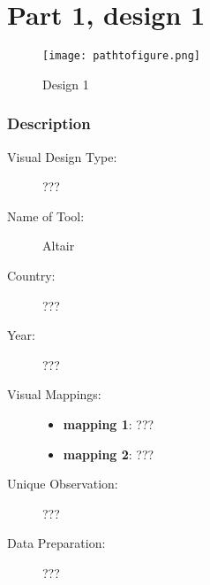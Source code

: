 \hypertarget{part-1-design-1}{%
\section{Part 1, design 1}\label{part-1-design-1}}

\begin{figure}
\centering
\texttt{[image: pathtofigure.png]}
\caption{Design 1}
\end{figure}

\hypertarget{description}{%
\subsubsection{Description}\label{description}}

\begin{description}
\item[Visual Design Type:]
???
\item[Name of Tool:]
Altair
\item[Country:]
???
\item[Year:]
???
\item[Visual Mappings:]
\begin{itemize}
\tightlist
\item
  \textbf{mapping 1}: ???
\end{itemize}

\begin{itemize}
\tightlist
\item
  \textbf{mapping 2}: ???
\end{itemize}
\item[Unique Observation:]
???
\item[Data Preparation:]
???
\end{description}
